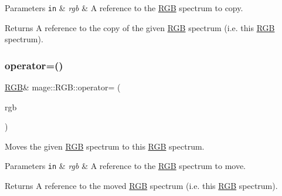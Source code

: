 \begin{DoxyParams}[1]{Parameters}
\mbox{\tt in}  & {\em rgb} & A reference to the \hyperlink{structmage_1_1_r_g_b}{R\+GB} spectrum to copy. \\
\hline
\end{DoxyParams}
\begin{DoxyReturn}{Returns}
A reference to the copy of the given \hyperlink{structmage_1_1_r_g_b}{R\+GB} spectrum (i.\+e. this \hyperlink{structmage_1_1_r_g_b}{R\+GB} spectrum). 
\end{DoxyReturn}
\hypertarget{structmage_1_1_r_g_b_a6a170116718ca911ef2aa8dd9a397389}{}\label{structmage_1_1_r_g_b_a6a170116718ca911ef2aa8dd9a397389} 
\subsubsection{\texorpdfstring{operator=()}{operator=()}\hspace{0.1cm}{\footnotesize\ttfamily [2/2]}}
{\footnotesize\ttfamily \hyperlink{structmage_1_1_r_g_b}{R\+GB}\& mage\+::\+R\+G\+B\+::operator= (\begin{DoxyParamCaption}\item[{\hyperlink{structmage_1_1_r_g_b}{R\+GB} \&\&}]{rgb }\end{DoxyParamCaption})\hspace{0.3cm}{\ttfamily [default]}}

Moves the given \hyperlink{structmage_1_1_r_g_b}{R\+GB} spectrum to this \hyperlink{structmage_1_1_r_g_b}{R\+GB} spectrum.


\begin{DoxyParams}[1]{Parameters}
\mbox{\tt in}  & {\em rgb} & A reference to the \hyperlink{structmage_1_1_r_g_b}{R\+GB} spectrum to move. \\
\hline
\end{DoxyParams}
\begin{DoxyReturn}{Returns}
A reference to the moved \hyperlink{structmage_1_1_r_g_b}{R\+GB} spectrum (i.\+e. this \hyperlink{structmage_1_1_r_g_b}{R\+GB} spectrum). 
\end{DoxyReturn}
